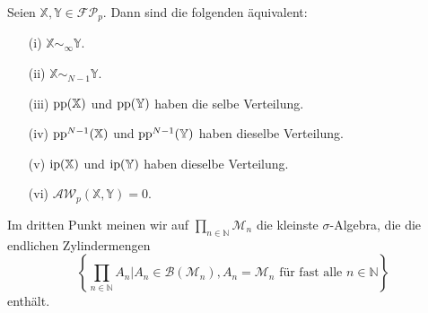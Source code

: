     \begin{theorem}\label{thm:awp_0_characterization}
        Seien $\mathbb{X,Y} \in \mathcal{FP}_p$. Dann sind die folgenden äquivalent:

        \begin{enumerate}
            \item[(i)] $\mathbb{X} \sim_\infty \mathbb{Y}$.
            \item[(ii)] $\mathbb{X} \sim_{N-1} \mathbb{Y}$.
            \item[(iii)] $\operatorname{pp}(\mathbb{X})$ und $\operatorname{pp}(\mathbb{Y})$ haben die selbe Verteilung.
            \item[(iv)] $\operatorname{pp}^{N-1}(\mathbb{X})$ und $\operatorname{pp}^{N-1}(\mathbb{Y})$ haben dieselbe Verteilung.
            \item[(v)] $\operatorname{ip}(\mathbb{X})$ und $\operatorname{ip}(\mathbb{Y})$ haben dieselbe Verteilung.
            \item[(vi)] $\mathcal{AW}_p(\mathbb{X}, \mathbb{Y})=0$.
        \end{enumerate}
        Im dritten Punkt meinen wir auf $\prod_{n \in \mathbb{N}} \mathcal{M}_n$ die kleinste $\sigma$-Algebra, die die endlichen Zylindermengen
        $$\left\{ \prod_{n\in\mathbb{N}} A_n \vert A_n \in \mathcal{B}(\mathcal{M}_n), A_n = \mathcal{M}_n \text{ für fast alle } n \in \mathbb{N}\right\}$$
        enthält.
    \end{theorem}
